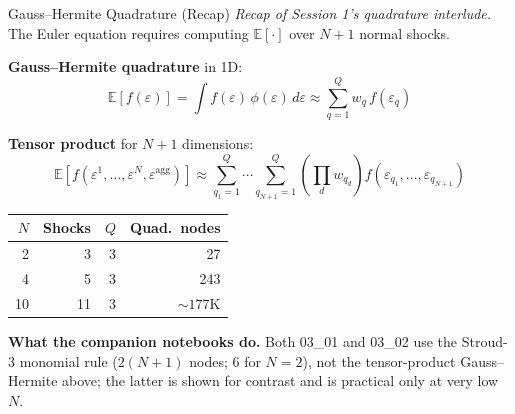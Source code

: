 \documentclass[aspectratio=169,11pt]{beamer}
\newcommand{\emphc}[1]{\textcolor{harvardcrimson}{#1}}
\newcommand{\E}[1]{\mathbb{E}\!\left[#1\right]}
\begin{document}
\begin{frame}{Gauss--Hermite Quadrature (Recap)}
{\scriptsize\emph{Recap of Session 1's quadrature interlude.}}\vspace{-0.3em}
\footnotesize
The Euler equation requires computing $\E{\cdot}$ over $N+1$ normal shocks.

\textbf{Gauss--Hermite quadrature} in 1D:
\[
\E{f(\varepsilon)} = \int f(\varepsilon)\, \phi(\varepsilon)\,d\varepsilon \approx \sum_{q=1}^{Q} w_q \, f(\varepsilon_q)
\]

\textbf{Tensor product} for $N+1$ dimensions:
\[
\E{f(\varepsilon^1, \ldots, \varepsilon^N, \varepsilon^{\text{agg}})} \approx \sum_{q_1=1}^{Q}\cdots\sum_{q_{N+1}=1}^{Q} \left(\prod_{d} w_{q_d}\right) f(\varepsilon_{q_1}, \ldots, \varepsilon_{q_{N+1}})
\]

\begin{center}
\begin{tabular}{rrrr}
\toprule
$N$ & \textbf{Shocks} & $Q$ & \textbf{Quad.\ nodes} \\
\midrule
2 & 3 & 3 & 27 \\
4 & 5 & 3 & 243 \\
10 & 11 & 3 & $\sim 177$K \\
\bottomrule
\end{tabular}
\end{center}

\vspace{0.2em}
{\footnotesize \textbf{What the companion notebooks do.} Both 03\_01 and 03\_02 use the \emphc{Stroud-3 monomial rule} ($2(N+1)$ nodes; $6$ for $N=2$), not the tensor-product Gauss--Hermite above; the latter is shown for contrast and is practical only at very low $N$.}
\end{frame}
\end{document}
